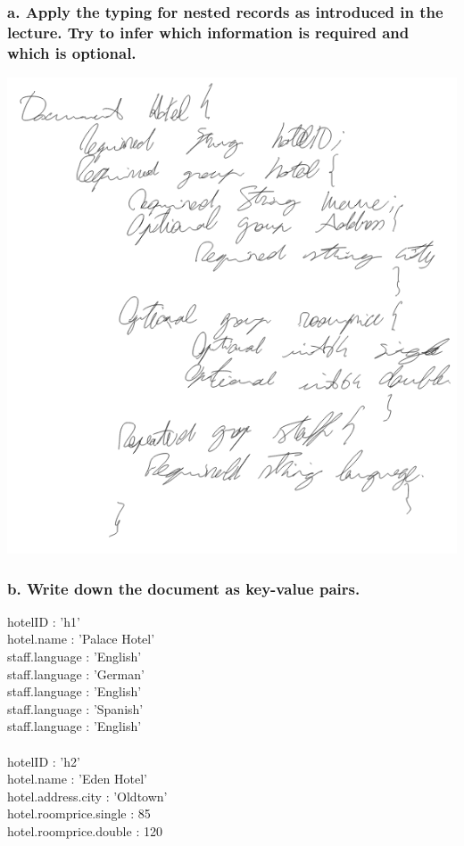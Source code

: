 \documentclass{article}
\begin{document}
\subsubsection{a. Apply the typing for nested records as introduced in the lecture. Try to infer which information is required and which is optional.}
\includegraphics[scale=0.4]{5_1.png}
\subsubsection{b. Write down the document as key-value pairs.}
hotelID : ’h1’\\
hotel.name : ’Palace Hotel’\\
staff.language : ’English’\\
staff.language : ’German’\\
staff.language : ’English’\\
staff.language : ’Spanish’\\
staff.language : ’English’\\\\

hotelID : ’h2’\\
hotel.name : ’Eden Hotel’\\
hotel.address.city : ’Oldtown’\\
hotel.roomprice.single : 85\\
hotel.roomprice.double : 120\\\\
\end{document}
